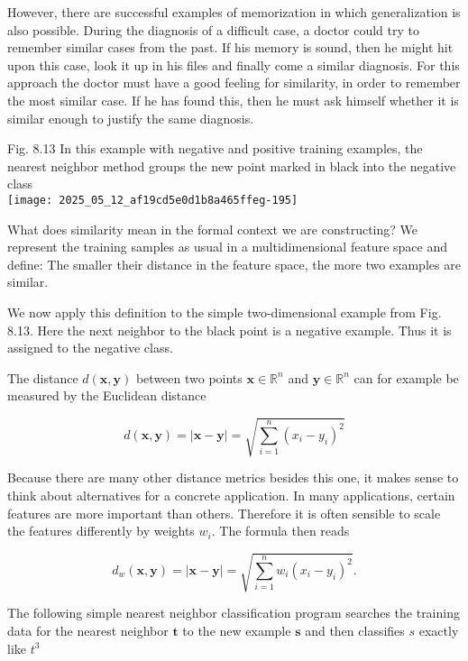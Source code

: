 \documentclass[10pt]{article}
\begin{document}
However, there are successful examples of memorization in which generalization is also possible. During the diagnosis of a difficult case, a doctor could try to remember similar cases from the past. If his memory is sound, then he might hit upon this case, look it up in his files and finally come a similar diagnosis. For this approach the doctor must have a good feeling for similarity, in order to remember the most similar case. If he has found this, then he must ask himself whether it is similar enough to justify the same diagnosis.

Fig. 8.13 In this example with negative and positive training examples, the nearest neighbor method groups the new point marked in black into the negative class\\
\texttt{[image: 2025\_05\_12\_af19cd5e0d1b8a465ffeg-195]}

What does similarity mean in the formal context we are constructing? We represent the training samples as usual in a multidimensional feature space and define: The smaller their distance in the feature space, the more two examples are similar.

We now apply this definition to the simple two-dimensional example from Fig. 8.13. Here the next neighbor to the black point is a negative example. Thus it is assigned to the negative class.

The distance $d(\boldsymbol{x}, \boldsymbol{y})$ between two points $\boldsymbol{x} \in \mathbb{R}^{n}$ and $\boldsymbol{y} \in \mathbb{R}^{n}$ can for example be measured by the Euclidean distance

$$
d(\boldsymbol{x}, \boldsymbol{y})=|\boldsymbol{x}-\boldsymbol{y}|=\sqrt{\sum_{i=1}^{n}\left(x_{i}-y_{i}\right)^{2}}
$$

Because there are many other distance metrics besides this one, it makes sense to think about alternatives for a concrete application. In many applications, certain features are more important than others. Therefore it is often sensible to scale the features differently by weights $w_{i}$. The formula then reads

$$
d_{w}(\boldsymbol{x}, \boldsymbol{y})=|\boldsymbol{x}-\boldsymbol{y}|=\sqrt{\sum_{i=1}^{n} w_{i}\left(x_{i}-y_{i}\right)^{2}} .
$$

The following simple nearest neighbor classification program searches the training data for the nearest neighbor $\boldsymbol{t}$ to the new example $\boldsymbol{s}$ and then classifies $s$ exactly like $t^{3}$
\end{document}
